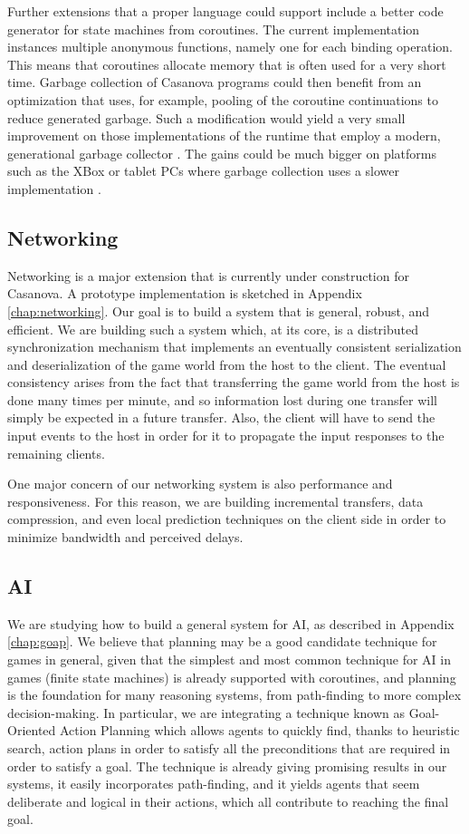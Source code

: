 Further extensions that a proper language could support include a better code generator for state machines from coroutines. The current implementation instances multiple anonymous functions, namely one for each binding operation. This means that coroutines allocate memory that is often used for a very short time. Garbage collection of Casanova programs could then benefit from an optimization that uses, for example, pooling of the coroutine continuations to reduce generated garbage. Such a modification would yield a very small improvement on those implementations of the runtime that employ a modern, generational garbage collector \cite{CHAPTER_9_GENERATIONAL_GC}. The gains could be much bigger on platforms such as the XBox or tablet PCs where garbage collection uses a slower implementation \cite{CHAPTER_9_XBOX_GC_ISSUES}.

\subsection{Networking}
Networking is a major extension that is currently under construction for Casanova. A prototype implementation is  sketched in Appendix \ref{chap:networking}. Our goal is to build a system that is general, robust, and efficient. We are building such a system which, at its core, is a distributed synchronization mechanism that implements an eventually consistent serialization and deserialization of the game world from the host to the client. The eventual consistency arises from the fact that transferring the game world from the host is done many times per minute, and so information lost during one transfer will simply be expected in a future transfer. Also, the client will have to send the input events to the host in order for it to propagate the input responses to the remaining clients.

One major concern of our networking system is also performance and responsiveness. For this reason, we are building incremental transfers, data compression, and even local prediction techniques on the client side in order to minimize bandwidth and perceived delays.

\subsection{AI}
We are studying how to build a general system for AI, as described in Appendix \ref{chap:goap}. We believe that planning may be a good candidate technique for games in general, given that the simplest and most common technique for AI in games (finite state machines) is already supported with coroutines, and planning is the foundation for many reasoning systems, from path-finding to more complex decision-making. In particular, we are integrating a technique known as Goal-Oriented Action Planning \cite{APPENDIX_C_GOAP_BOOK} which allows agents to quickly find, thanks to heuristic search, action plans in order to satisfy all the preconditions that are required in order to satisfy a goal. The technique is already giving promising results in our systems, it easily incorporates path-finding, and it yields agents that seem deliberate and logical in their actions, which all contribute to reaching the final goal.

